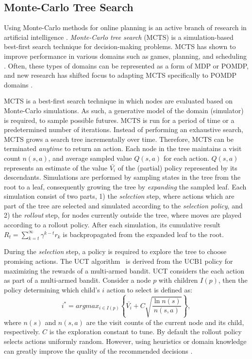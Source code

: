 \documentclass[conference]{IEEEtran}
\begin{document}
\subsection{Monte-Carlo Tree Search}
\label{sub:mcts}

Using Monte-Carlo methods for online planning is an active branch of research in artificial intelligence \cf \cite{browne2012survey}. {\it Monte-Carlo tree search} (MCTS) \cite{coulom2007efficient,kocsis2006bandit} is a simulation-based best-first search technique for decision-making problems. MCTS has shown to improve performance in various domains such as games, planning, and scheduling \cite{browne2012survey}. Often, these types of domains can be represented as a form of MDP or POMDP, and new research has shifted focus to adapting MCTS specifically to POMDP domains \cite{silver2010monte,Feldman12BRUE}. 

MCTS is a best-first search technique in which nodes are evaluated based on Monte-Carlo simulations. As such, a generative model of the domain (\ie simulator) is required, to sample possible futures. MCTS is run for a period of time or a predetermined number of iterations. Instead of performing an exhaustive search, MCTS grows a search tree incrementally over time. Therefore, MCTS can be terminated \emph{anytime} to return an action. Each node in the tree maintains a visit count $n(s, a)$, and average sampled value $Q(s, a)$ for each action. $Q(s, a)$ represents an estimate of the value $\bar{V_i}$ of the (partial) policy represented by its descendants. Simulations are performed by sampling states in the tree from the root to a leaf, consequently growing the tree by \emph{expanding} the sampled leaf. Each simulation consist of two parts, 1) the \emph{selection} step, where actions which are part of the tree are selected and simulated according to the {\it selection policy}, and 2) the \emph{rollout} step, for nodes currently outside the tree, where moves are played according to a rollout policy. After each simulation, its cumulative result $R_t = \sum\nolimits_{k=t}^{\infty} \gamma^{k−t}r_k$ is backpropagated from the expanded leaf to the root. 

During the \emph{selection} step, a policy is required to explore the tree to choose promising actions. The UCT algorithm~\cite{kocsis2006bandit} is derived from the UCB1 policy \cite{auer2002using} for maximizing the rewards of a multi-armed bandit. UCT considers the each action as part of a multi-armed bandit. Consider a node $p$ with children $I(p)$, then the policy determining which child's $i$ action to select is defined as:
\begin{equation}
\label{eq:uct}
i^* = argmax_{i \in I(p)}\left\{ \bar{V_i} + C \sqrt{ \frac{\ln{n(s)}}{n(s, a)}}\right\},
\end{equation}
where $n(s)$ and $n(s, a)$ are the visit counts of the current node and its child, respectively. $C$ is the exploration constant to tune. By default the rollout policy selects actions uniformly random. However, using heuristics or domain knowledge can greatly improve the quality of the recommended decisions \cite{browne2012survey}.
\end{document}
